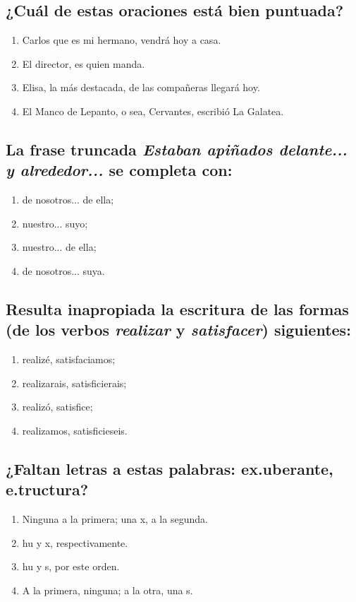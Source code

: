 \documentclass[12pt, a4paper, oneside]{report}
\begin{document}
            \subsection{¿Cuál de estas oraciones está bien puntuada?}
                \begin{enumerate}
                    \item Carlos que es mi hermano, vendrá hoy a casa.
                    \item El director, es quien manda.
                    \item Elisa, la más destacada, de las compañeras llegará hoy.
                    \item \color{verde}El Manco de Lepanto, o sea, Cervantes, escribió La
                    Galatea\color{negro}.
                \end{enumerate}
            \subsection{La frase truncada \textit{Estaban apiñados delante... y alrededor...} se completa
            con:}
                \begin{enumerate}
                    \item \color{verde}de nosotros... de ella\color{negro};
                    \item nuestro... suyo;
                    \item nuestro... de ella;
                    \item de nosotros... suya.
                \end{enumerate}
            \subsection{Resulta inapropiada la escritura de las formas (de los verbos \textit{realizar} y
            \textit{satisfacer}) siguientes:}
                \begin{enumerate}
                    \item \color{verde}realizé, satisfaciamos\color{negro};
                    \item realizarais, satisficierais;
                    \item realizó, satisfice;
                    \item realizamos, satisficieseis.
                \end{enumerate}
            \subsection{¿Faltan letras a estas palabras: ex.uberante, e.tructura?}
                \begin{enumerate}
                    \item Ninguna a la primera; una x, a la segunda.
                    \item hu y x, respectivamente.
                    \item hu y s, por este orden.
                    \item \color{verde}A la primera, ninguna; a la otra, una s\color{negro}.
                \end{enumerate}
\end{document}
